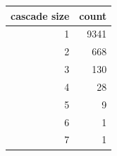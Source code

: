 \begin{tabular}{rr}
\toprule
cascade size & count \\
\midrule
1 & 9341 \\
2 & 668 \\
3 & 130 \\
4 & 28 \\
5 & 9 \\
6 & 1 \\
7 & 1 \\
\bottomrule
\end{tabular}